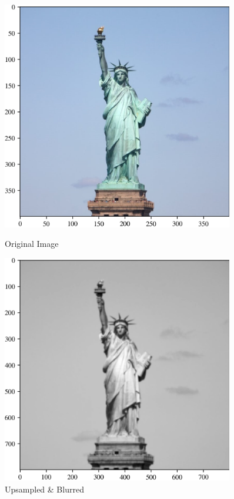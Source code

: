 \documentclass[11pt,a4paper]{article}
\begin{document}
\begin{figure}[ht!]
  \centering
  \begin{minipage}{0.45\textwidth}
    \centering
    \includegraphics[width=0.9\textwidth]{figs/original.png} %
    \caption{Original Image}
  \end{minipage}
  \quad
  \begin{minipage}{0.45\textwidth}
    \centering
    \includegraphics[width=0.9\textwidth]{figs/upsampled_blurred.png} %
    \caption{Upsampled \& Blurred}
  \end{minipage}
\end{figure}
\end{document}
